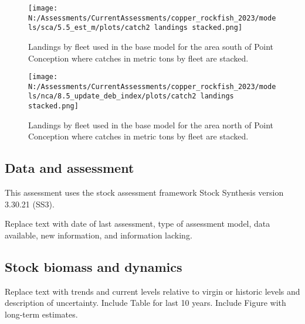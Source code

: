 \documentclass[11pt,
  english,
  letterpaper,
]{article}
\begin{document}




\begin{figure}
\centering
\texttt{[image: N:/Assessments/CurrentAssessments/copper\_rockfish\_2023/models/sca/5.5\_est\_m/plots/catch2 landings stacked.png]}
\caption{Landings by fleet used in the base model for the area south of Point Conception where catches in metric tons by fleet are stacked.\label{fig:es-south-catch}}
\end{figure}

\begin{figure}
\centering
\texttt{[image: N:/Assessments/CurrentAssessments/copper\_rockfish\_2023/models/nca/8.5\_update\_deb\_index/plots/catch2 landings stacked.png]}
\caption{Landings by fleet used in the base model for the area north of Point Conception where catches in metric tons by fleet are stacked.\label{fig:es-north-catch}}
\end{figure}

\hypertarget{data-and-assessment}{%
\subsection*{Data and assessment}\label{data-and-assessment}}

This assessment uses the stock assessment framework Stock Synthesis version 3.30.21 (SS3).

Replace text with date of last assessment, type of assessment model, data available, new information, and information lacking.

\hypertarget{stock-biomass-and-dynamics}{%
\subsection*{Stock biomass and dynamics}\label{stock-biomass-and-dynamics}}

Replace text with trends and current levels relative to virgin or historic levels and description of uncertainty. Include Table for last 10 years. Include Figure with long-term estimates.





\begingroup\fontsize{10}{12}\selectfont
\begingroup\fontsize{10}{12}\selectfont
\end{document}

